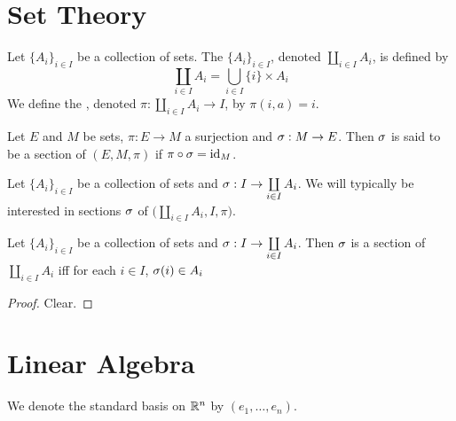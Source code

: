 \documentclass{book}
\begin{document}
	\section{Set Theory}
	
	\begin{defn}
		Let $\{A_i\}_{i \in I}$ be a collection of sets. The  $\{A_i\}_{i \in I}$, denoted $\coprod\limits_{i \in I} A_i$, is defined by $$\coprod_{i \in I}A_i = \bigcup_{i\in I} \{i\} \times A_i$$ 
		We define the , denoted $\pi: \coprod\limits_{i \in I} A_i \rightarrow I$, by $\pi(i, a) = i$.
	\end{defn}

	\begin{defn}
		Let $E$ and $M$ be sets, $\pi:E \rightarrow M$ a surjection and $\sigma: M \rightarrow E$. Then $\sigma$ is said to be a section of $(E, M, \pi)$ if $\pi \circ \sigma = \operatorname{id}_M$. 
	\end{defn}


	\begin{note}
		Let $\{A_i\}_{i \in I}$ be a collection of sets and $\sigma: I \rightarrow \coprod\limits_{i \in I} A_i$. We will typically be interested in sections $\sigma$ of $\bigg( \coprod\limits_{i \in I} A_i, I, \pi \bigg)$.
	\end{note}

	\begin{ex}
		Let $\{A_i\}_{i \in I}$ be a collection of sets and $\sigma: I \rightarrow \coprod\limits_{i \in I} A_i$. Then $\sigma$ is a section of $\coprod\limits_{i \in I} A_i$ iff for each $i \in I$, $\sigma(i) \in A_i$
	\end{ex}
	
	\begin{proof}
		Clear.
	\end{proof}















	\newpage
	\section{Linear Algebra}
	
	\begin{note}
		We denote the standard basis on $\mathbb{R}^n$ by $(e_1, \ldots, e_n)$.
	\end{note}
\end{document}
